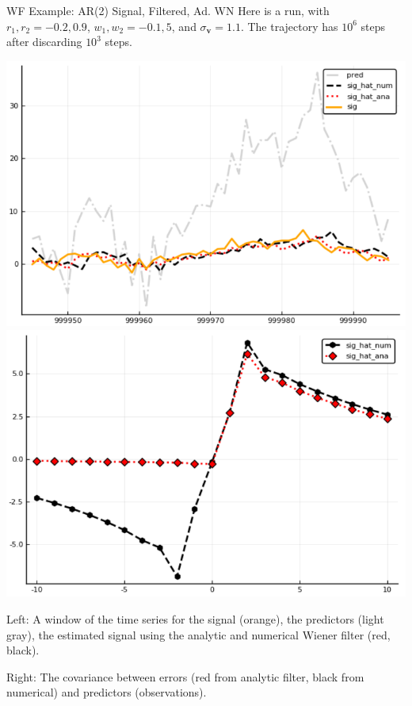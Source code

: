 \documentclass{beamer}  %
\begin{document}
\begin{frame}{WF Example: AR(2) Signal, Filtered, Ad. WN}
	Here is a run, with $r_1,r_2 = -0.2, 0.9$, $w_1,w_2 = -0.1, 5$, and $\sigma_{\textbf{v}} = 1.1$. The trajectory has $10^6$ steps after discarding $10^3$ steps. 
	
	\includegraphics[scale=.33]{fig/figAR2F_ts.png}
	\includegraphics[scale=.33]{fig/figAR2F_cov.png}
	
	Left: A window of the time series for the signal (orange), the predictors (light gray), the estimated signal using the analytic and numerical Wiener filter (red, black). 
	
	Right: The covariance between errors (red from analytic filter, black from numerical) and predictors (observations). \\
\end{frame}
\end{document}
